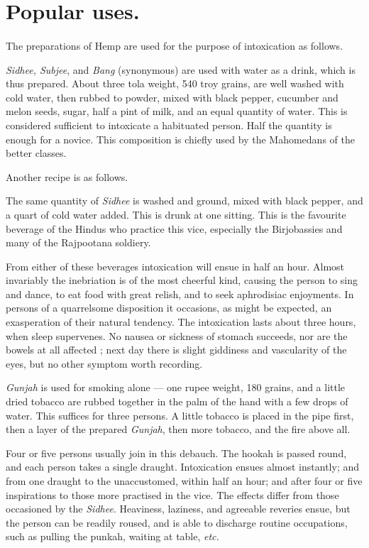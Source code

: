 \documentclass[a4paper, 11pt, oneside, polutonikogreek, english]{article}
\begin{document}
\section{Popular uses.}
\paragraph{}
The preparations of Hemp are used for the purpose of intoxication as follows.

\emph{Sidhee, Subjee}, and \emph{Bang} (synonymous) are used with water as a drink, which is thus prepared. About three tola weight, 540 troy grains, are well washed with cold water, then rubbed to powder, mixed with black pepper, cucumber and melon seeds, sugar, half a pint of milk, and an equal quantity of water. This is considered sufficient to intoxicate a habituated person. Half the quantity is enough for a novice. This composition is chiefly used by the Mahomedans of the better classes.

Another recipe is as follows.

The same quantity of \emph{Sidhee} is washed and ground, mixed with black pepper, and a quart of cold water added. This is drunk at one sitting. This is the favourite beverage of the Hindus who practice this vice, especially the Birjobassies and many of the Rajpootana soldiery.

From either of these beverages intoxication will ensue in half an hour. Almost invariably the inebriation is of the most cheerful kind, causing the person to sing and dance, to eat food with great relish, and to seek aphrodisiac enjoyments. In persons of a quarrelsome disposition it occasions, as might be expected, an exasperation of their natural tendency. The intoxication lasts about three hours, when sleep supervenes. No nausea or sickness of stomach succeeds, nor are the bowels at all affected ; next day there is slight giddiness and vascularity of the eyes, but no other symptom worth recording.

\emph{Gunjah} is used for smoking alone --- one rupee weight, 180 grains, and a little dried tobacco are rubbed together in the palm of the hand with a few drops of water. This suffices for three persons. A little tobacco is placed in the pipe first, then a layer of the prepared \emph{Gunjah}, then more tobacco, and the fire above all.

Four or five persons usually join in this debauch. The hookah is passed round, and each person takes a single draught. Intoxication ensues almost instantly; and from one draught to the unaccustomed, within half an hour; and after four or five inspirations to those more practised in the vice. The effects differ from those occasioned by the \emph{Sidhee}. Heaviness, laziness, and agreeable reveries ensue, but the person can be readily roused, and is able to discharge routine occupations, such as pulling the punkah, waiting at table, \emph{etc.}
\end{document}

